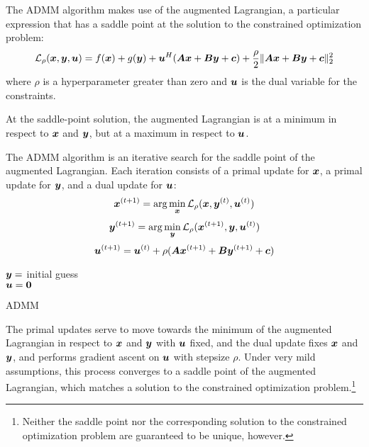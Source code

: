 The ADMM algorithm makes use of the augmented Lagrangian, a particular expression that has a saddle point at the solution to the constrained optimization problem:
%
\begin{equation}
\mathcal{L}_{\rho}(\bm{x},\bm{y},\bm{u}) = f(\bm{x}) + g(\bm{y}) + \bm{u}^H(\bm{A}\bm{x} + \bm{B}\bm{y} + \bm{c}) + \frac{\rho}{2}\|\bm{A}\bm{x} + \bm{B}\bm{y} + \bm{c}\|_2^2
\end{equation}
%
where $\rho$ is a hyperparameter greater than zero and $\bm{u}$ is the dual variable for the constraints.

At the saddle-point solution, the augmented Lagrangian is at a minimum in respect to $\bm{x}$ and $\bm{y}$, but at a maximum in respect to $\bm{u}$.

The ADMM algorithm is an iterative search for the saddle point of the augmented Lagrangian. Each iteration consists of a primal update for $\bm{x}$, a primal update for $\bm{y}$, and a dual update for $\bm{u}$:
%
\begin{equation}
\bm{x}^{(t + 1)} = \arg\min_{\bm{x}} \mathcal{L}_{\rho}(\bm{x},\bm{y}^{(t)},\bm{u}^{(t)})
\end{equation}
%
\begin{equation}
\bm{y}^{(t + 1)} = \arg\min_{\bm{y}} \mathcal{L}_{\rho}(\bm{x}^{(t + 1)},\bm{y},\bm{u}^{(t)})
\end{equation}
%
\begin{equation} \label{equation:general dual update}
\bm{u}^{(t + 1)} = \bm{u}^{(t)} + \rho(\bm{A}\bm{x}^{(t + 1)} + \bm{B}\bm{y}^{(t + 1)} + \bm{c})
\end{equation}
%
\begin{algorithm}[H]
\SetAlgoLined
   $\bm{y} = $ initial guess \\
   $\bm{u} = \bm{0}$ \\
 \caption{ADMM}
\end{algorithm}

The primal updates serve to move towards the minimum of the augmented Lagrangian in respect to $\bm{x}$ and $\bm{y}$ with $\bm{u}$ fixed, and the dual update fixes $\bm{x}$ and $\bm{y}$, and performs gradient ascent on $\bm{u}$ with stepsize $\rho$. Under very mild assumptions, this process converges to a saddle point of the augmented Lagrangian, which matches a solution to the constrained optimization problem.\footnote{Neither the saddle point nor the corresponding solution to the constrained optimization problem are guaranteed to be unique, however.}

